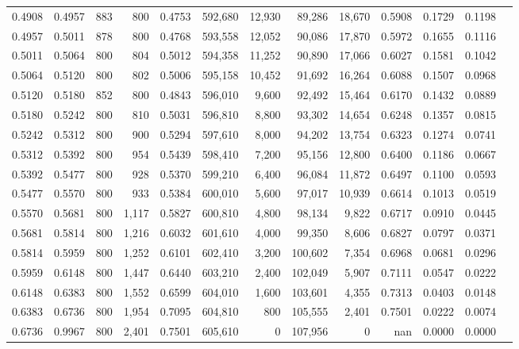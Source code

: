 \begin{tabular}{rrrrrrrrrrrrr}
0.4908 & 0.4957 &    883 &   800 &                                     0.4753 & 592,680 &  12,930 &  89,286 &  18,670 & 0.5908 & 0.1729 & 0.1198 \\
0.4957 & 0.5011 &    878 &   800 &                                     0.4768 & 593,558 &  12,052 &  90,086 &  17,870 & 0.5972 & 0.1655 & 0.1116 \\
0.5011 & 0.5064 &    800 &   804 &                                     0.5012 & 594,358 &  11,252 &  90,890 &  17,066 & 0.6027 & 0.1581 & 0.1042 \\
0.5064 & 0.5120 &    800 &   802 &                                     0.5006 & 595,158 &  10,452 &  91,692 &  16,264 & 0.6088 & 0.1507 & 0.0968 \\
0.5120 & 0.5180 &    852 &   800 &                                     0.4843 & 596,010 &   9,600 &  92,492 &  15,464 & 0.6170 & 0.1432 & 0.0889 \\
0.5180 & 0.5242 &    800 &   810 &                                     0.5031 & 596,810 &   8,800 &  93,302 &  14,654 & 0.6248 & 0.1357 & 0.0815 \\
0.5242 & 0.5312 &    800 &   900 &                                     0.5294 & 597,610 &   8,000 &  94,202 &  13,754 & 0.6323 & 0.1274 & 0.0741 \\
0.5312 & 0.5392 &    800 &   954 &                                     0.5439 & 598,410 &   7,200 &  95,156 &  12,800 & 0.6400 & 0.1186 & 0.0667 \\
0.5392 & 0.5477 &    800 &   928 &                                     0.5370 & 599,210 &   6,400 &  96,084 &  11,872 & 0.6497 & 0.1100 & 0.0593 \\
0.5477 & 0.5570 &    800 &   933 &                                     0.5384 & 600,010 &   5,600 &  97,017 &  10,939 & 0.6614 & 0.1013 & 0.0519 \\
0.5570 & 0.5681 &    800 & 1,117 &                                     0.5827 & 600,810 &   4,800 &  98,134 &   9,822 & 0.6717 & 0.0910 & 0.0445 \\
0.5681 & 0.5814 &    800 & 1,216 &                                     0.6032 & 601,610 &   4,000 &  99,350 &   8,606 & 0.6827 & 0.0797 & 0.0371 \\
0.5814 & 0.5959 &    800 & 1,252 &                                     0.6101 & 602,410 &   3,200 & 100,602 &   7,354 & 0.6968 & 0.0681 & 0.0296 \\
0.5959 & 0.6148 &    800 & 1,447 &                                     0.6440 & 603,210 &   2,400 & 102,049 &   5,907 & 0.7111 & 0.0547 & 0.0222 \\
0.6148 & 0.6383 &    800 & 1,552 &                                     0.6599 & 604,010 &   1,600 & 103,601 &   4,355 & 0.7313 & 0.0403 & 0.0148 \\
0.6383 & 0.6736 &    800 & 1,954 &                                     0.7095 & 604,810 &     800 & 105,555 &   2,401 & 0.7501 & 0.0222 & 0.0074 \\
0.6736 & 0.9967 &    800 & 2,401 &                                     0.7501 & 605,610 &       0 & 107,956 &       0 &    nan & 0.0000 & 0.0000 \\
\bottomrule
\end{tabular}
